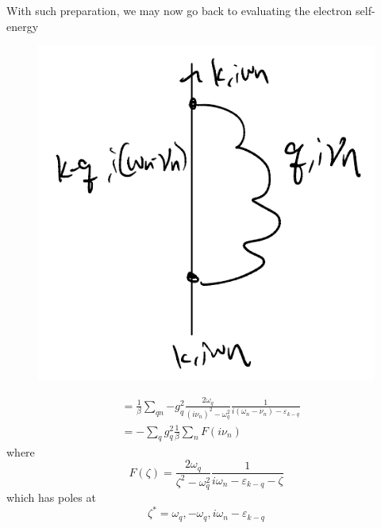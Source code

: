 With such preparation, we may now go back to evaluating the electron self-energy
\begin{figure}[H]
    \centering
    \includegraphics{jupyterbook/data/fig/lec24-fig02.png}
\end{figure}
\begin{align*}
    &=\frac{1}{\beta}\sum_{qn}{-g_{q}^{2}\frac{2\omega _q}{\left( i\nu _n \right) ^2-\omega _{q}^{2}}\frac{1}{i\left( \omega _n-\nu _n \right) -\varepsilon _{k-q}}}\\
    &=-\sum_{q}{g_{q}^{2}\frac{1}{\beta}\sum_n{F\left( i\nu _n \right)}}
\end{align*}
where
\[F\left( \zeta \right) =\frac{2\omega _q}{\zeta ^2-\omega _{q}^{2}}\frac{1}{i\omega _n-\varepsilon _{k-q}-\zeta}\]
which has poles at
\[\zeta ^*=\omega _q,-\omega _q,i\omega _n-\varepsilon _{k-q}\]

